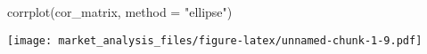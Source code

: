 \documentclass[
]{article}
\newenvironment{Shaded}{\begin{snugshade}}{\end{snugshade}}
\newcommand{\AttributeTok}[1]{\textcolor[rgb]{0.77,0.63,0.00}{#1}}
\newcommand{\FunctionTok}[1]{\textcolor[rgb]{0.00,0.00,0.00}{#1}}
\newcommand{\NormalTok}[1]{#1}
\newcommand{\StringTok}[1]{\textcolor[rgb]{0.31,0.60,0.02}{#1}}
\begin{document}
\begin{Shaded}
\begin{Highlighting}[]
\FunctionTok{corrplot}\NormalTok{(cor\_matrix, }\AttributeTok{method =} \StringTok{"ellipse"}\NormalTok{)}
\end{Highlighting}
\end{Shaded}

\texttt{[image: market\_analysis\_files/figure-latex/unnamed-chunk-1-9.pdf]}
\end{document}
